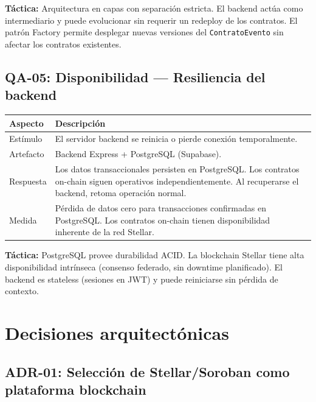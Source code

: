 \documentclass[12pt,oneside]{article}
\begin{document}
\textbf{Táctica:} Arquitectura en capas con separación estricta. El backend actúa como intermediario y puede evolucionar sin requerir un redeploy de los contratos. El patrón Factory permite desplegar nuevas versiones del \texttt{ContratoEvento} sin afectar los contratos existentes.

\subsection{QA-05: Disponibilidad — Resiliencia del backend}

\begin{table}[htbp]
\centering
\begin{tabularx}{\textwidth}{l X}
\toprule
\textbf{Aspecto} & \textbf{Descripción} \\
\midrule
Estímulo & El servidor backend se reinicia o pierde conexión temporalmente. \\
Artefacto & Backend Express + PostgreSQL (Supabase). \\
Respuesta & Los datos transaccionales persisten en PostgreSQL. Los contratos on-chain siguen operativos independientemente. Al recuperarse el backend, retoma operación normal. \\
Medida & Pérdida de datos cero para transacciones confirmadas en PostgreSQL. Los contratos on-chain tienen disponibilidad inherente de la red Stellar. \\
\bottomrule
\end{tabularx}
\end{table}

\textbf{Táctica:} PostgreSQL provee durabilidad ACID. La blockchain Stellar tiene alta disponibilidad intrínseca (consenso federado, sin downtime planificado). El backend es stateless (sesiones en JWT) y puede reiniciarse sin pérdida de contexto.

\FloatBarrier
\clearpage
\section{Decisiones arquitectónicas}
\label{sec:decisiones}

\subsection{ADR-01: Selección de Stellar/Soroban como plataforma blockchain}
\end{document}
